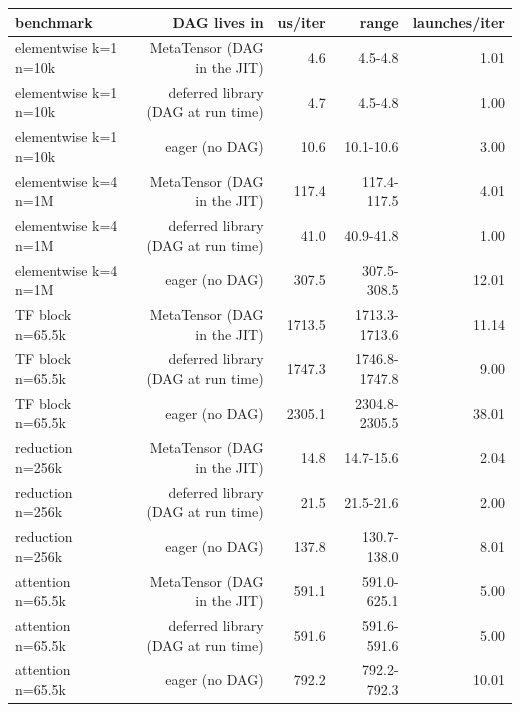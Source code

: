 \begin{tabular}{lrrrr}
\toprule
benchmark & DAG lives in & us/iter & range & launches/iter \\
\midrule
elementwise k=1 n=10k & MetaTensor (DAG in the JIT) & 4.6 & 4.5-4.8 & 1.01 \\
elementwise k=1 n=10k & deferred library (DAG at run time) & 4.7 & 4.5-4.8 & 1.00 \\
elementwise k=1 n=10k & eager (no DAG) & 10.6 & 10.1-10.6 & 3.00 \\
elementwise k=4 n=1M & MetaTensor (DAG in the JIT) & 117.4 & 117.4-117.5 & 4.01 \\
elementwise k=4 n=1M & deferred library (DAG at run time) & 41.0 & 40.9-41.8 & 1.00 \\
elementwise k=4 n=1M & eager (no DAG) & 307.5 & 307.5-308.5 & 12.01 \\
TF block n=65.5k & MetaTensor (DAG in the JIT) & 1713.5 & 1713.3-1713.6 & 11.14 \\
TF block n=65.5k & deferred library (DAG at run time) & 1747.3 & 1746.8-1747.8 & 9.00 \\
TF block n=65.5k & eager (no DAG) & 2305.1 & 2304.8-2305.5 & 38.01 \\
reduction n=256k & MetaTensor (DAG in the JIT) & 14.8 & 14.7-15.6 & 2.04 \\
reduction n=256k & deferred library (DAG at run time) & 21.5 & 21.5-21.6 & 2.00 \\
reduction n=256k & eager (no DAG) & 137.8 & 130.7-138.0 & 8.01 \\
attention n=65.5k & MetaTensor (DAG in the JIT) & 591.1 & 591.0-625.1 & 5.00 \\
attention n=65.5k & deferred library (DAG at run time) & 591.6 & 591.6-591.6 & 5.00 \\
attention n=65.5k & eager (no DAG) & 792.2 & 792.2-792.3 & 10.01 \\
\bottomrule
\end{tabular}
